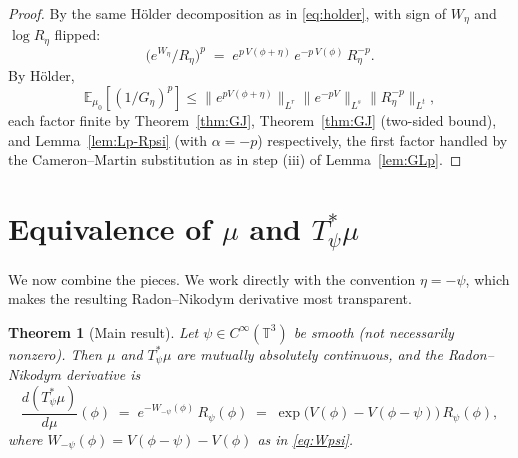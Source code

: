\documentclass[12pt]{article}
\newtheorem{theorem}{Theorem}
\theoremstyle{definition}
\begin{document}
\begin{proof}
By the same H\"older decomposition as in \eqref{eq:holder}, with sign of $W_\eta$ and
$\log R_\eta$ flipped:
\[
\bigl(e^{W_\eta}/R_\eta\bigr)^p \;=\; e^{p\,V(\phi+\eta)}\,e^{-p\,V(\phi)}\,R_\eta^{-p}.
\]
By H\"older,
\[
\mathbb{E}_{\mu_0}[(1/G_\eta)^p]
\le\bigl\|e^{pV(\phi+\eta)}\bigr\|_{L^r}\bigl\|e^{-pV}\bigr\|_{L^s}\bigl\|R_\eta^{-p}\bigr\|_{L^t},
\]
each factor finite by Theorem~\ref{thm:GJ}, Theorem~\ref{thm:GJ} (two-sided bound), and
Lemma~\ref{lem:Lp-Rpsi} (with $\alpha=-p$) respectively, the first factor handled by the
Cameron--Martin substitution as in step (iii) of Lemma~\ref{lem:GLp}.
\end{proof}

\section{Equivalence of $\mu$ and $T_\psi^*\mu$}

We now combine the pieces. We work directly with the convention
$\eta=-\psi$, which makes the resulting Radon--Nikodym derivative most transparent.

\begin{theorem}[Main result]\label{thm:main}
Let $\psi\in C^\infty(\mathbb{T}^3)$ be smooth (not necessarily nonzero). Then $\mu$ and
$T_\psi^*\mu$ are mutually absolutely continuous, and the Radon--Nikodym derivative is
\begin{equation}\label{eq:RN-mu}
\frac{d(T_\psi^*\mu)}{d\mu}(\phi) \;=\; e^{-W_{-\psi}(\phi)}\,R_\psi(\phi)
\;=\; \exp\!\bigl(V(\phi)-V(\phi-\psi)\bigr)\,R_\psi(\phi),
\end{equation}
where $W_{-\psi}(\phi)=V(\phi-\psi)-V(\phi)$ as in \eqref{eq:Wpsi}.
\end{theorem}
\end{document}
